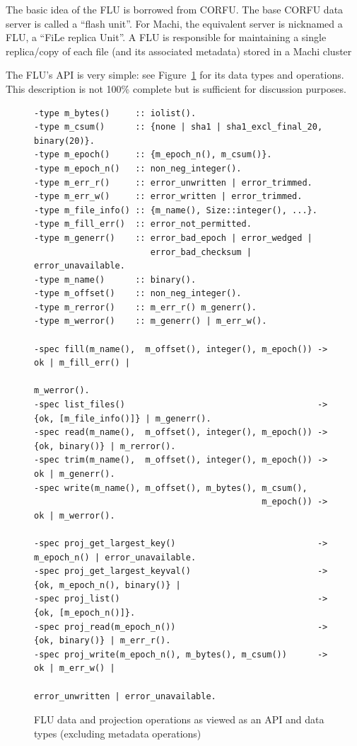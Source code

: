 \documentclass[preprint,10pt]{sigplanconf}
\begin{document}
The basic idea of the FLU is borrowed from CORFU.  The base CORFU
data server is called a ``flash unit''.  For Machi, the equivalent
server is nicknamed a FLU, a ``FiLe replica Unit''.  A FLU is
responsible for maintaining a single replica/copy of each file
(and its associated metadata) stored in a Machi cluster

The FLU's API is very simple: see Figure~\ref{fig:flu-api} for its
data types and operations.  This description is not 100\% complete but
is sufficient for discussion purposes.

\begin{figure}[]
\begin{verbatim}
-type m_bytes()     :: iolist().
-type m_csum()      :: {none | sha1 | sha1_excl_final_20, binary(20)}.
-type m_epoch()     :: {m_epoch_n(), m_csum()}.
-type m_epoch_n()   :: non_neg_integer().
-type m_err_r()     :: error_unwritten | error_trimmed.
-type m_err_w()     :: error_written | error_trimmed.
-type m_file_info() :: {m_name(), Size::integer(), ...}.
-type m_fill_err()  :: error_not_permitted.
-type m_generr()    :: error_bad_epoch | error_wedged |
                       error_bad_checksum | error_unavailable.
-type m_name()      :: binary().
-type m_offset()    :: non_neg_integer().
-type m_rerror()    :: m_err_r() m_generr().
-type m_werror()    :: m_generr() | m_err_w().

-spec fill(m_name(),  m_offset(), integer(), m_epoch()) -> ok | m_fill_err() |
                                                           m_werror().
-spec list_files()                                      -> {ok, [m_file_info()]} | m_generr().
-spec read(m_name(),  m_offset(), integer(), m_epoch()) -> {ok, binary()} | m_rerror().
-spec trim(m_name(),  m_offset(), integer(), m_epoch()) -> ok | m_generr().
-spec write(m_name(), m_offset(), m_bytes(), m_csum(),
                                             m_epoch()) -> ok | m_werror().

-spec proj_get_largest_key()                            -> m_epoch_n() | error_unavailable.
-spec proj_get_largest_keyval()                         -> {ok, m_epoch_n(), binary()} |
-spec proj_list()                                       -> {ok, [m_epoch_n()]}.
-spec proj_read(m_epoch_n())                            -> {ok, binary()} | m_err_r().
-spec proj_write(m_epoch_n(), m_bytes(), m_csum())      -> ok | m_err_w() |
                                                           error_unwritten | error_unavailable. 
\end{verbatim}
\caption{FLU data and projection operations as viewed as an API and data types (excluding metadata operations)}
\label{fig:flu-api}
\end{figure}
\end{document}
